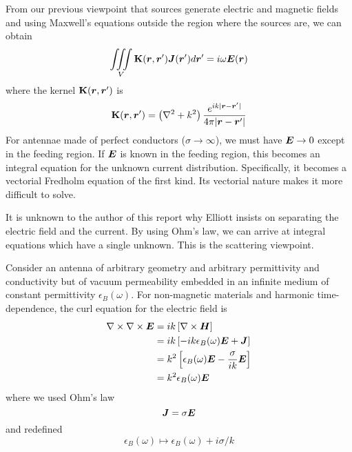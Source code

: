 From our previous
viewpoint that sources generate electric and magnetic fields 
and using Maxwell's equations outside the region where the sources 
are, we can obtain \cite{ELL2003}
  \begin{equation}
    \mathop{\iiint}_V \mathbf{K}(\boldsymbol{r},\boldsymbol{r}')\boldsymbol{J}(\boldsymbol{r}')d\boldsymbol{r}' = i\omega\boldsymbol{E}(\boldsymbol{r})
  \end{equation}
where the kernel $\mathbf{K}(\boldsymbol{r},\boldsymbol{r}')$ is 
  \begin{equation}
    \mathbf{K}(\boldsymbol{r},\boldsymbol{r}') = \left(\nabla^2+k^2\right)\frac{e^{ik|\boldsymbol{r}-\boldsymbol{r}'|}}{4\pi|\boldsymbol{r}-\boldsymbol{r}'|}
  \end{equation}
For antennae made of perfect conductors ($\sigma\rightarrow\infty$), we must have $\boldsymbol{E}\rightarrow0$
except in the feeding region. If $\boldsymbol{E}$ is known in the feeding region, this becomes an integral equation
for the unknown current distribution. Specifically, it becomes a vectorial Fredholm equation of the first kind. 
Its vectorial nature makes it more difficult to solve. 

It is unknown to the author of this report why Elliott insists on separating the electric field and the current. 
By using Ohm's law, we can arrive at integral equations which have a single unknown. This is the 
scattering viewpoint. 
  
Consider an antenna of arbitrary geometry and arbitrary
permittivity and conductivity but of  vacuum permeability embedded in an infinite
medium of constant permittivity $\epsilon_B(\omega)$. For non-magnetic materials
and harmonic time-dependence, 
the curl equation for the electric field is 
  \begin{align*}
   \nabla\times\nabla\times\boldsymbol{E}	&=ik\left[\nabla\times\boldsymbol{H}\right]	\\
					&=ik\left[-ik\epsilon_B(\omega)\boldsymbol{E}+\boldsymbol{J}\right]	\\
					&=k^2\left[\epsilon_B(\omega)\boldsymbol{E}-\frac{\sigma}{ik}\boldsymbol{E}\right]	\\
					&=k^2\epsilon_B(\omega)\boldsymbol{E}
  \end{align*}
where we used Ohm's law
  \begin{equation}
   \boldsymbol{J}=\sigma\boldsymbol{E}
  \end{equation}
and redefined 
  \begin{equation}
   \epsilon_B(\omega)\mapsto\epsilon_B(\omega)+i\sigma/k
  \end{equation}

